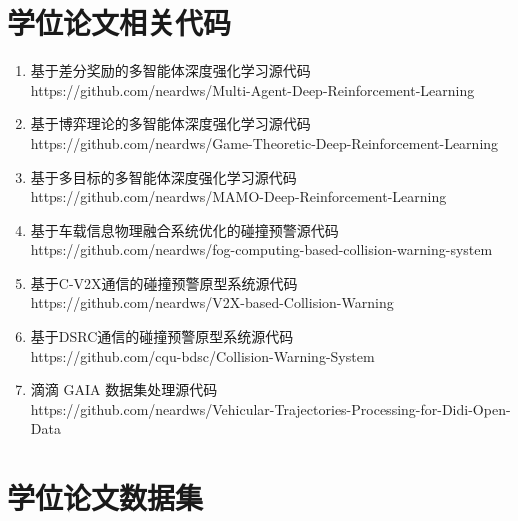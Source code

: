 \section[\hspace{-2pt}学位论文相关代码]{{ \hspace{-8pt}学位论文相关代码}}
\begin{enumerate}
	\item 基于差分奖励的多智能体深度强化学习源代码\\https://github.com/neardws/Multi-Agent-Deep-Reinforcement-Learning
	\item 基于博弈理论的多智能体深度强化学习源代码\\https://github.com/neardws/Game-Theoretic-Deep-Reinforcement-Learning
	\item 基于多目标的多智能体深度强化学习源代码\\https://github.com/neardws/MAMO-Deep-Reinforcement-Learning
	\item 基于车载信息物理融合系统优化的碰撞预警源代码\\https://github.com/neardws/fog-computing-based-collision-warning-system
	\item 基于C-V2X通信的碰撞预警原型系统源代码\\https://github.com/neardws/V2X-based-Collision-Warning
	\item 基于DSRC通信的碰撞预警原型系统源代码\\https://github.com/cqu-bdsc/Collision-Warning-System
	\item 滴滴 GAIA 数据集处理源代码\\https://github.com/neardws/Vehicular-Trajectories-Processing-for-Didi-Open-Data
\end{enumerate}

\newpage
\section[\hspace{-2pt}学位论文数据集]{{ \hspace{-8pt}学位论文数据集}}

